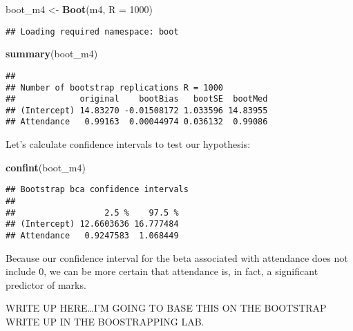 \documentclass[
]{article}
\newenvironment{Shaded}{\begin{snugshade}}{\end{snugshade}}
\newcommand{\AttributeTok}[1]{\textcolor[rgb]{0.13,0.29,0.53}{#1}}
\newcommand{\DecValTok}[1]{\textcolor[rgb]{0.00,0.00,0.81}{#1}}
\newcommand{\FunctionTok}[1]{\textcolor[rgb]{0.13,0.29,0.53}{\textbf{#1}}}
\newcommand{\NormalTok}[1]{#1}
\newcommand{\OtherTok}[1]{\textcolor[rgb]{0.56,0.35,0.01}{#1}}
\begin{document}
\begin{Shaded}
\begin{Highlighting}[]
\NormalTok{boot\_m4 }\OtherTok{\textless{}{-}} \FunctionTok{Boot}\NormalTok{(m4, }\AttributeTok{R =} \DecValTok{1000}\NormalTok{)}
\end{Highlighting}
\end{Shaded}

\begin{verbatim}
## Loading required namespace: boot
\end{verbatim}

\begin{Shaded}
\begin{Highlighting}[]
\FunctionTok{summary}\NormalTok{(boot\_m4)}
\end{Highlighting}
\end{Shaded}

\begin{verbatim}
## 
## Number of bootstrap replications R = 1000 
##             original    bootBias   bootSE  bootMed
## (Intercept) 14.83270 -0.01508172 1.033596 14.83955
## Attendance   0.99163  0.00044974 0.036132  0.99086
\end{verbatim}

Let's calculate confidence intervals to test our hypothesis:

\begin{Shaded}
\begin{Highlighting}[]
\FunctionTok{confint}\NormalTok{(boot\_m4)}
\end{Highlighting}
\end{Shaded}

\begin{verbatim}
## Bootstrap bca confidence intervals
## 
##                  2.5 %    97.5 %
## (Intercept) 12.6603636 16.777484
## Attendance   0.9247583  1.068449
\end{verbatim}

Because our confidence interval for the beta associated with attendance does not include 0, we can be more certain that attendance is, in fact, a significant predictor of marks.

WRITE UP HERE\ldots I'M GOING TO BASE THIS ON THE BOOTSTRAP WRITE UP IN THE BOOSTRAPPING LAB.
\end{document}
